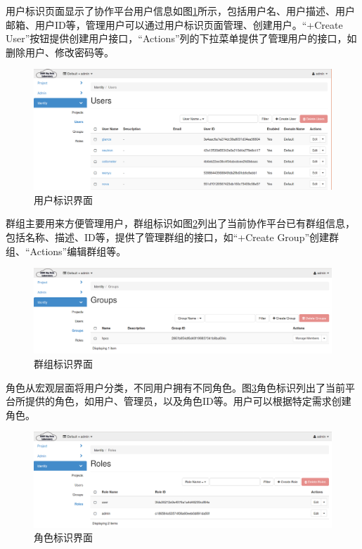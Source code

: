 \documentclass[12pt]{article}
\begin{document}
用户标识页面显示了协作平台用户信息如图\ref{fig:identityusers}所示，包括用户名、用户描述、用户邮箱、用户ID等，管理用户可以通过用户标识页面管理、创建用户。“+Create User”按钮提供创建用户接口，“Actions”列的下拉菜单提供了管理用户的接口，如删除用户、修改密码等。
\begin{figure}[!htb]
\centering
\includegraphics[width=6in]{./figures/Identity_Users}
\caption{用户标识界面}
\label{fig:identityusers}
\end{figure}
群组主要用来方便管理用户，群组标识如图\ref{fig:identitygroups}列出了当前协作平台已有群组信息，包括名称、描述、ID等，提供了管理群组的接口，如“+Create Group”创建群组、“Actions”编辑群组等。
\begin{figure}[!htb]
\centering
\includegraphics[width=6in]{./figures/Identity_Groups}
\caption{群组标识界面}
\label{fig:identitygroups}
\end{figure}
角色从宏观层面将用户分类，不同用户拥有不同角色。图\ref{fig:identityroles}角色标识列出了当前平台所提供的角色，如用户、管理员，以及角色ID等。用户可以根据特定需求创建角色。
\begin{figure}[!htb]
\centering
\includegraphics[width=6in]{./figures/Identity_Roles}
\caption{角色标识界面}
\label{fig:identityroles}
\end{figure}
\end{document}
